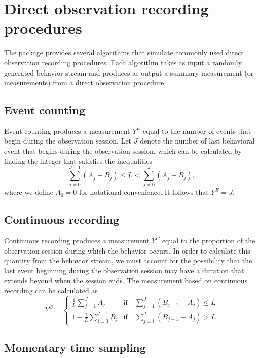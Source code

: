\documentclass{article}\usepackage[]{graphicx}\usepackage[]{color}
\begin{document}
\section{Direct observation recording procedures}

The package provides several algorithms that simulate commonly used direct observation recording procedures. Each algorithm takes as input a randomly generated behavior stream and produces as output a summary measurement (or measurements) from a direct observation procedure. 

\subsection{Event counting}

Event counting produces a measurement $Y^E$ equal to the number of events that begin during the observation session. Let $J$ denote the number of last behavioral event that begins during the observation session, which can be calculated by finding the integer that satisfies the inequalities \[
\sum_{j=0}^{J-1} \left(A_j + B_j \right) \leq L < \sum_{j=0}^{J} \left(A_j + B_j \right), \]
where we define $A_0 = 0$ for notational convenience. It follows that $Y^E = J$. 

\subsection{Continuous recording}

Continuous recording produces a measurement $Y^C$ equal to the proportion of the observation session during which the behavior occurs. In order to calculate this quantity from the behavior stream, we must account for the possibility that the last event beginning during the observation session may have a duration that extends beyond when the session ends. The measurement based on continuous recording can be calculated as\[
Y^C = \begin{cases}
\frac{1}{L} \sum_{j=1}^J A_j & \text{if}\quad \sum_{j=1}^{J} \left(B_{j-1} + A_j\right) \leq L \\
1 - \frac{1}{L} \sum_{j=0}^{J-1} B_j & \text{if}\quad \sum_{j=1}^{J} \left(B_{j-1} + A_j\right) > L
\end{cases} \]


\subsection{Momentary time sampling}
\end{document}
